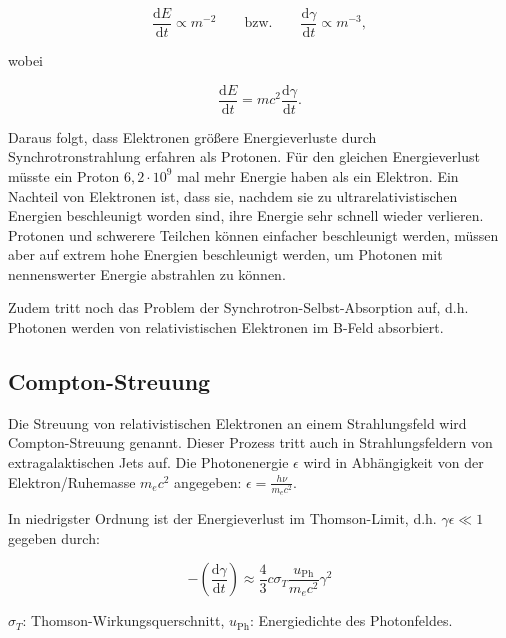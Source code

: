 \begin{equation}
 \frac{\mathrm{d}E}{\mathrm{d}t}\propto m^{-2} \qquad \text{bzw.} \qquad \frac{\mathrm{d}\gamma}{\mathrm{d}t}\propto m^{-3},
\end{equation}

wobei 

\begin{equation}
 \frac{\mathrm{d}E}{\mathrm{d}t} = mc^2 \frac{\mathrm{d}\gamma}{\mathrm{d}t}.
\end{equation}

Daraus folgt, dass Elektronen größere Energieverluste durch Synchrotronstrahlung erfahren als Protonen.
Für den gleichen Energieverlust müsste ein Proton $6,2\cdot10^9$ mal mehr Energie haben als ein Elektron.
Ein Nachteil von Elektronen ist, dass sie, nachdem sie zu ultrarelativistischen Energien beschleunigt worden sind, ihre Energie sehr schnell wieder verlieren.
Protonen und schwerere Teilchen können einfacher beschleunigt werden,  müssen aber auf extrem hohe Energien beschleunigt werden, um Photonen mit nennenswerter Energie abstrahlen zu können.

Zudem tritt noch das Problem der Synchrotron-Selbst-Absorption auf, d.h. Photonen werden von relativistischen Elektronen im B-Feld absorbiert.\cite{RelativisticJets}

\subsection{Compton-Streuung}
Die Streuung von relativistischen Elektronen an einem Strahlungsfeld wird Compton-Streuung genannt.
Dieser Prozess tritt auch in Strahlungsfeldern von extragalaktischen Jets auf.
Die Photonenergie $\epsilon$ wird in Abhängigkeit von der Elektron\-/Ruhemasse $m_e c^2$ angegeben: $\epsilon= \frac{h\nu}{m_e c^2}$. \cite{RelativisticJets}
 
In niedrigster Ordnung ist der Energieverlust im Thomson-Limit, d.h. $\gamma \epsilon \ll 1$ gegeben durch:

\begin{equation}
-\left(\frac{\mathrm{d}\gamma}{\mathrm{d}t} \right) \approx \frac{4}{3} c \sigma_T \frac{u_{\text{Ph}}}{m_e c^2} \gamma^2
\end{equation}

\begin{center}
 \begin{small}
  $\sigma_T$: Thomson-Wirkungsquerschnitt, $u_{\text{Ph}}$: Energiedichte des Photonfeldes.
 \end{small}
\end{center}

